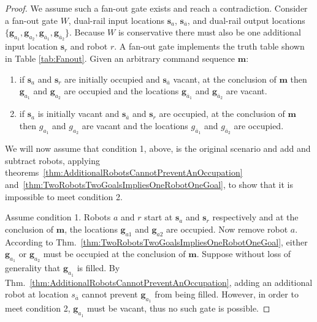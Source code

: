\documentclass[letterpaper, 10 pt, conference]{ieeeconf}
\begin{document}

\begin{proof} We assume such a {\sc fan-out} gate exists and reach a contradiction. 
Consider a  {\sc fan-out} gate $W$,  dual-rail input locations  $\bm{s}_{a}$, $\bm{s}_{\overline{a}}$, and dual-rail output locations  $\{\bm{g}_{a_1}, \bm{g}_{a_2},\bm{g}_{\overline{a}_1},\bm{g}_{\overline{a}_2}\}$. Because $W$ is conservative there must also be one additional input location $\bm{s}_r$ and robot $r$. A {\sc fan-out} gate implements the truth table shown in Table \ref{tab:Fanout}. Given an arbitrary command sequence $\bm{m}$:  
\begin{enumerate}
\item if $\bm{s}_{a}$  and $\bm{s}_r$ are initially occupied and $\bm{s}_{\overline{a}}$ vacant, at the conclusion of $\bm{m}$ then $\bm{g}_{a_1}$ and $\bm{g}_{a_2}$ are occupied and the locations  $\bm{g}_{\overline{a}_1}$ and $\bm{g}_{\overline{a}_2}$ are vacant.
\item if $\bm{s}_{a}$ is initially vacant and $\bm{s}_{\overline{a}}$ and $\bm{s}_r$ are occupied, at the conclusion of $\bm{m}$ then $g_{a_1}$ and $g_{a_2}$ are vacant and the locations  $g_{\overline{a}_1}$ and $g_{\overline{a}_2}$ are occupied.
\end{enumerate}

We will now assume that condition 1, above, is the original scenario and  add and subtract robots, applying theorems~\ref{thm:AdditionalRobotsCannotPreventAnOccupation} and~\ref{thm:TwoRobotsTwoGoalsImpliesOneRobotOneGoal}, to show that it is impossible to meet condition 2. 

Assume condition 1. Robots $a$ and $r$ start at $\bm{s}_{a}$ and $\bm{s}_r$  respectively and at the conclusion of $\bm{m}$, the locations  $\bm{g}_{a1}$ and $\bm{g}_{a2}$ are occupied. Now remove robot $a$. According to  Thm.~\ref{thm:TwoRobotsTwoGoalsImpliesOneRobotOneGoal}, either $\bm{g}_{a_1}$ or $\bm{g}_{a_2}$ must be occupied at the conclusion of $\bm{m}$. Suppose without loss of generality that $\bm{g}_{a_1}$ is filled.  By Thm.~\ref{thm:AdditionalRobotsCannotPreventAnOccupation}, adding an additional robot at location $s_{\overline{a}}$ cannot prevent $\bm{g}_{a_1}$ from being filled. However, in order to meet condition 2, $\bm{g}_{a_1}$ must be vacant, thus no such gate is possible. 
 \end{proof}
\end{document}
